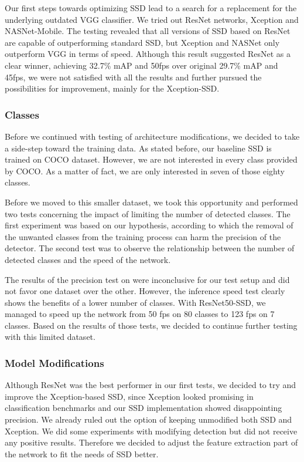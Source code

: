 Our first steps towards optimizing SSD lead to a search for a replacement for the underlying outdated VGG classifier. We tried out ResNet networks, Xception and NASNet-Mobile. The testing revealed that all versions of SSD based on ResNet are capable of outperforming standard SSD, but Xception and NASNet only outperform VGG in terms of speed. Although this result suggested ResNet as a clear winner, achieving 32.7\% mAP and 50fps over original 29.7\% mAP and 45fps, we were not satisfied with all the results and further pursued the possibilities for improvement, mainly for the Xception-SSD. 

\subsubsection*{Classes}
Before we continued with testing of architecture modifications, we decided to take a side-step toward the training data. As stated before, our baseline SSD is trained on COCO dataset. However, we are not interested in every class provided by COCO. As a matter of fact, we are only interested in seven of those eighty classes.

Before we moved to this smaller dataset, we took this opportunity and performed two tests concerning the impact of limiting the number of detected classes. The first experiment was based on our hypothesis, according to which the removal of the unwanted classes from the training process can harm the precision of the detector. The second test was to observe the relationship between the number of detected classes and the speed of the network.

The results of the precision test on were inconclusive for our test setup and did not favor one dataset over the other. However, the inference speed test clearly shows the benefits of a lower number of classes. With ResNet50-SSD, we managed to speed up the network from 50 fps on 80 classes to 123 fps on 7 classes. Based on the results of those tests, we decided to continue further testing with this limited dataset.

\subsubsection*{Model Modifications}
Although ResNet was the best performer in our first tests, we decided to try and improve the Xception-based SSD, since Xception looked promising in classification benchmarks and our SSD implementation showed disappointing precision. We already ruled out the option of keeping unmodified both SSD and Xception. We did some experiments with modifying detection but did not receive any positive results. Therefore we decided to adjust the feature extraction part of the network to fit the needs of SSD better.

